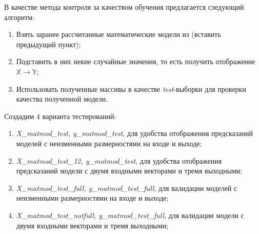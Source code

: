 \documentclass[11pt]{article}
\begin{document}
В качестве метода контроля за качеством обучения предлагается следующий
алгоритм:

\begin{enumerate}
    \item Взять заранее рассчитанные математические модели из {\Large (вставить предыдущий пункт)};
    \item Подставить в них некие случайные значения, то есть получить отображение $\mathbb{X}\rightarrow \mathbb{Y}$;
    \item Использовать полученные массивы в качестве \textit{test}-выборки для проверки качества полученной модели.
\end{enumerate}

Создадим 4 варианта тестирований:

\begin{enumerate}
    \item \textit{X\_matmod\_test, y\_matmod\_test}, для удобства отображения предсказаний моделей с неизменными размерностями на входе и выходе;
    \item \textit{X\_matmod\_test\_12, y\_matmod\_test}, для удобства отображения предсказаний модели с двумя входными векторами и тремя выходными;
    \item \textit{X\_matmod\_test\_full, y\_matmod\_test\_full}, для валидации моделей с неизменными размерностями на входе и выходе;
    \item \textit{X\_matmod\_test\_notfull, y\_matmod\_test\_full}, для валидации модели с двумя входными векторами и тремя выходными;
\end{enumerate}
\end{document}
